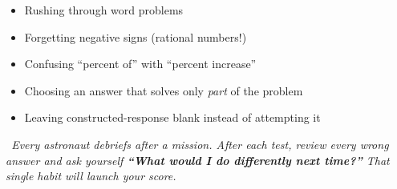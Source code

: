 {%
\begin{tcolorbox}[
    enhanced,
    colback=funRed!6,
    colframe=funRed!40,
    arc=8pt, boxrule=1pt,
    left=4mm, right=4mm, top=3mm, bottom=3mm,
    title={\faTimesCircle~Red-Alert Traps},
    colbacktitle=funRed!12,
    coltitle=black,
    fonttitle=\bfseries\sffamily,
]
    \small
    \begin{itemize}[leftmargin=*, itemsep=3pt]
        \item Rushing through word problems
        \item Forgetting negative signs (rational numbers!)
        \item Confusing ``percent of'' with ``percent increase''
        \item Choosing an answer that solves only \textit{part} of the problem
        \item Leaving constructed-response blank instead of attempting it
    \end{itemize}
\end{tcolorbox}

\vspace{3mm}

\begin{tcolorbox}[
    enhanced,
    colback=funOrange!6,
    colframe=funOrange!30,
    arc=10pt, boxrule=0.8pt,
    left=5mm, right=5mm, top=3mm, bottom=3mm,
]
    \begin{minipage}[c]{0.07\linewidth}
        \centering \iconOwl[1cm]
    \end{minipage}%
    \hfill
    \begin{minipage}[c]{0.90\linewidth}
        \small\itshape\color{funBlueDark}
        \faQuoteLeft~Every astronaut debriefs after a mission.
        After each test, review every wrong answer and ask yourself
        \textbf{``What would I do differently next time?''}
        That single habit will launch your score.~\faQuoteRight
    \end{minipage}
\end{tcolorbox}

}

\newpage

